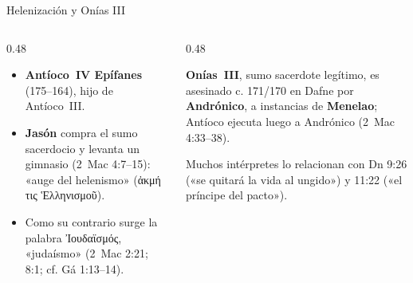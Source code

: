 \documentclass[hyperref={bookmarks=false},aspectratio=169]{beamer}
\newcommand{\grc}[1]{\foreignlanguage{ancientgreek}{#1}}
\begin{document}
\begin{frame}{Helenización y Onías III}
\begin{columns}[T,onlytextwidth]
\begin{column}{0.48\textwidth}\footnotesize
\begin{itemize}
\item \textbf{Antíoco~IV Epífanes} (175--164), hijo de Antíoco~III.\medskip
\item \textbf{Jasón} compra el sumo sacerdocio y levanta un gimnasio (2~Mac 4:7--15): «auge del helenismo» (\grc{ἀκμή τις Ἑλληνισμοῦ}).\medskip
\item Como su contrario surge la palabra \grc{Ἰουδαϊσμός}, «judaísmo» (2~Mac 2:21; 8:1; cf. Gá 1:13--14).
\end{itemize}
\end{column}
\begin{column}{0.48\textwidth}
\begin{notalam}
\footnotesize\textbf{Onías~III}, sumo sacerdote legítimo, es asesinado c. 171/170 en Dafne por \textbf{Andrónico}, a instancias de \textbf{Menelao}; Antíoco ejecuta luego a Andrónico (2~Mac 4:33--38).\par\smallskip
Muchos intérpretes lo relacionan con Dn 9:26 («se quitará la vida al ungido») y 11:22 («el príncipe del pacto»).
\end{notalam}
\end{column}
\end{columns}
\end{frame}
\end{document}
